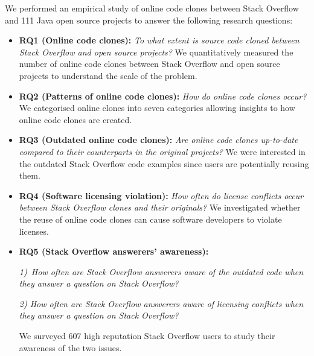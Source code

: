 \documentclass[10pt,journal,compsoc]{IEEEtran}
\begin{document}
We performed an empirical study of online code clones between Stack
Overflow and 111 Java open source projects to answer the following
research questions:
\begin{itemize}
	\item \textbf{RQ1 (Online code clones): }\textit{To what extent is source
		code cloned between Stack Overflow and open source projects?} We
	quantitatively measured the number of online code clones between Stack
	Overflow and open source projects to understand the scale of the
	problem. 
	\item \textbf{RQ2 (Patterns of online code clones): }\textit{How do online
		code clones occur?} We categorised online clones into seven
	categories allowing insights to how online code clones are created.
	\item \textbf{RQ3 (Outdated online code clones): }\textit{Are
		online code clones up-to-date compared to their counterparts in the
		original projects?} We were interested in the outdated Stack
	Overflow code examples since users are potentially reusing
	them. 
	\item \textbf{RQ4 (Software licensing violation): }\textit{How often do
		license conflicts occur between Stack Overflow clones and their
		originals?} We investigated whether the reuse of online code clones
	can cause software developers to violate licenses.
	\item \textbf{RQ5 (Stack Overflow answerers' awareness): }
	
	\textit{1)~How often are Stack Overflow
		answerers aware of the outdated code when
		they answer a question on Stack Overflow?} 
	
	\textit{2) How often are Stack Overflow
			answerers aware of licensing conflicts when
			they answer a question on Stack Overflow?} 
	
	We surveyed 607 high reputation Stack Overflow users to study their
	awareness of the two issues.
\end{itemize}
\end{document}

